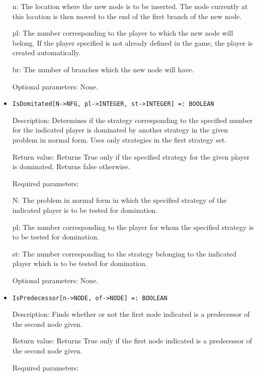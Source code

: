\begin{itemize}
\bd
\item
[n:] The location where the new node is to be inserted.  The node
currently at this location is then moved to the end of the first
branch of the new node.
\item
[pl:] The number corresponding to the player to which the new node
will belong.  If the player specified is not already defined in	the
game, the player is created automatically.
\item
[br:] The number of branches which the new node will have.
\ed

\item
[Optional parameters:] None.
\ed

\item
\protect \large \begin{verbatim}
IsDomitated[N->NFG, pl->INTEGER, st->INTEGER] =: BOOLEAN
\end{verbatim}\normalsize

\bd
\item
[Description:] Determines if the strategy corresponding to the
specified number for the indicated player is dominated by another
strategy in the given problem in normal form.  Uses only strategies in
the first strategy set.
\item
[Return value:] Returns True only if the specified strategy for the
given player is dominated.  Returns false otherwise.
\item
[Required parameters:]\hfil\null

\bd
\item
[N:] The problem in normal form in which the specified strategy of the
indicated player is to be tested for domination.
\item
[pl:] The number corresponding to the player for whom the specified
strategy is to be tested for domination.
\item
[st:] The number corresponding to the strategy belonging to the
indicated player which is to be tested for domination.
\ed

\item
[Optional parameters:] None.
\ed

\item
\protect \large \begin{verbatim}
IsPredecessor[n->NODE, of->NODE] =: BOOLEAN
\end{verbatim}\normalsize

\bd
\item
[Description:] Finds whether or not the first node indicated is a
predecessor of the second node given.
\item
[Return value:] Returns True only if the first node indicated is a
predecessor of the second node given.
\item
[Required parameters:]\hfil\null


\end{itemize}
